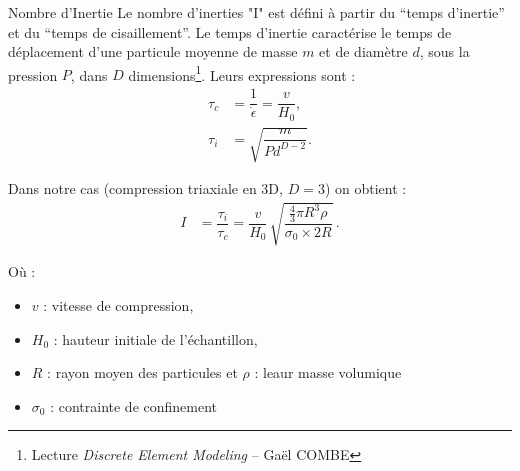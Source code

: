 \documentclass[9pt]{beamer}
\begin{document}
\begin{frame}{Nombre d'Inertie}
    Le nombre d'inerties "I" est défini à partir du ``temps d'inertie'' et du ``temps de cisaillement''.
    Le temps d'inertie caractérise le temps de déplacement d'une particule moyenne de masse $m$ et de diamètre $d$, sous la pression $P$, dans $D$ dimensions\footnote{Lecture \textit{Discrete Element Modeling} – Gaël COMBE}. Leurs expressions sont :
    \begin{align}
        	\tau_c &= \dfrac{1}{\dot{\epsilon}} = \dfrac{v}{H_0}, \\
        	\tau_i &= \sqrt{\dfrac{m}{P d^{D-2}}} .
    \end{align}

    Dans notre cas (compression triaxiale en 3D, $D=3$) on obtient :
    \begin{align}
        I &= \dfrac{\tau_i}{\tau_c}
        = \dfrac{v}{H_0}\,\sqrt{\dfrac{\tfrac{4}{3}\pi R^3 \rho}{\sigma_{0}\times 2R}} \,.
    \end{align}

    Où :
    \begin{itemize}
        \item $v$ : vitesse de compression,
        \item $H_0$ : hauteur initiale de l'échantillon,
        \item $R$ : rayon moyen des particules et $\rho$ : leaur masse volumique 
        \item $\sigma_{0}$ : contrainte de confinement
    \end{itemize}
\end{frame}
\end{document}
